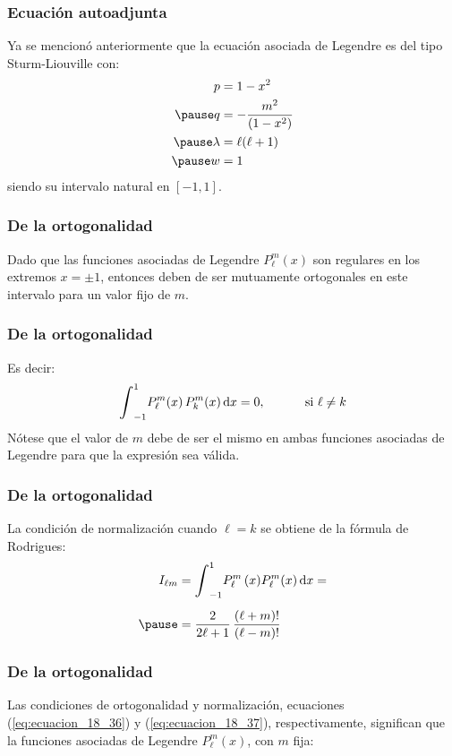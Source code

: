\documentclass[12pt]{beamer}
\begin{document}
\begin{frame}
\frametitle{Ecuación autoadjunta}
Ya se mencionó anteriormente que la ecuación asociada de Legendre es del tipo Sturm-Liouville con:
\pause
\begin{eqnarray*}
\begin{aligned}
p &= 1 - x^{2} \\ \pause
q &= - \dfrac{m^{2}}{(1 - x^{2})} \\ \pause
\lambda &= \ell (\ell + 1) \\ \pause
w &= 1
\end{aligned}
\end{eqnarray*}
siendo su intervalo natural en $[-1,1]$.
\end{frame}
\begin{frame}
\frametitle{De la ortogonalidad}
Dado que las funciones asociadas de Legendre $P_{\ell}^{m} (x)$ son regulares en los extremos $x = \pm 1$, entonces deben de ser mutuamente ortogonales en este intervalo para un valor fijo de $m$.
\end{frame}
\begin{frame}
\frametitle{De la ortogonalidad}
Es decir:
\pause
\begin{equation}
\scaleint{6ex}_{-1}^{1} P_{\ell}^{m} (x) \, P_{k}^{m} (x) \dd{x} = 0, \hspace{1cm} \text{ si } \ell \neq k
\label{eq:ecuacion_18_36}
\end{equation}
Nótese que el valor de $m$ debe de ser el mismo en ambas funciones asociadas de Legendre para que la expresión sea válida.
\end{frame}
\begin{frame}
\frametitle{De la ortogonalidad}
La condición de normalización cuando $\ell = k$ se obtiene de la fórmula de Rodrigues:
\pause
\begin{equation}
\begin{aligned}[b]
I_{\ell m} &= \scaleint{6ex}_{-1}^{1} P_{\ell}^{m} \, (x) P_{\ell}^{m} (x) \dd{x} = \\[0.5em] \pause
&= \dfrac{2}{2 \ell + 1} \, \dfrac{(\ell +m)!}{(\ell - m)!}
\end{aligned}
\label{eq:ecuacion_18_37}
\end{equation}
\end{frame}
\begin{frame}
\frametitle{De la ortogonalidad}
Las condiciones de ortogonalidad y normalización, ecuaciones (\ref{eq:ecuacion_18_36}) y (\ref{eq:ecuacion_18_37}), respectivamente, \pause significan que la funciones asociadas de Legendre $P_{\ell}^{m}(x)$, con $m$ fija:
\end{frame}
\end{document}
